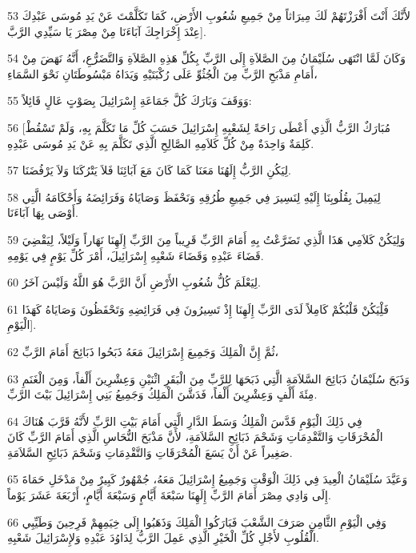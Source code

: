 \par 53 لأَنَّكَ أَنْتَ أَفْرَزْتَهُمْ لَكَ مِيرَاثاً مِنْ جَمِيعِ شُعُوبِ الأَرْضِ، كَمَا تَكَلَّمْتَ عَنْ يَدِ مُوسَى عَبْدِكَ عِنْدَ إِخْرَاجِكَ آبَاءَنَا مِنْ مِصْرَ يَا سَيِّدِي الرَّبَّ].
\par 54 وَكَانَ لَمَّا انْتَهَى سُلَيْمَانُ مِنَ الصَّلاَةِ إِلَى الرَّبِّ بِكُلِّ هَذِهِ الصَّلاَةِ وَالتَّضَرُّعِ، أَنَّهُ نَهَضَ مِنْ أَمَامِ مَذْبَحِ الرَّبِّ مِنَ الْجُثُوِّ عَلَى رُكْبَتَيْهِ وَيَدَاهُ مَبْسُوطَتَانِ نَحْوَ السَّمَاءِ،
\par 55 وَوَقَفَ وَبَارَكَ كُلَّ جَمَاعَةِ إِسْرَائِيلَ بِصَوْتٍ عَالٍ قَائِلاً:
\par 56 [مُبَارَكٌ الرَّبُّ الَّذِي أَعْطَى رَاحَةً لِشَعْبِهِ إِسْرَائِيلَ حَسَبَ كُلِّ مَا تَكَلَّمَ بِهِ، وَلَمْ تَسْقُطْ كَلِمَةٌ وَاحِدَةٌ مِنْ كُلِّ كَلاَمِهِ الصَّالِحِ الَّذِي تَكَلَّمَ بِهِ عَنْ يَدِ مُوسَى عَبْدِهِ.
\par 57 لِيَكُنِ الرَّبُّ إِلَهُنَا مَعَنَا كَمَا كَانَ مَعَ آبَائِنَا فَلاَ يَتْرُكَنَا وَلاَ يَرْفُضَنَا.
\par 58 لِيَمِيلَ بِقُلُوبِنَا إِلَيْهِ لِنَسِيرَ فِي جَمِيعِ طُرُقِهِ وَنَحْفَظَ وَصَايَاهُ وَفَرَائِضَهُ وَأَحْكَامَهُ الَّتِي أَوْصَى بِهَا آبَاءَنَا.
\par 59 وَلِيَكُنْ كَلاَمِي هَذَا الَّذِي تَضَرَّعْتُ بِهِ أَمَامَ الرَّبِّ قَرِيباً مِنَ الرَّبِّ إِلَهِنَا نَهَاراً وَلَيْلاً، لِيَقْضِيَ قَضَاءَ عَبْدِهِ وَقَضَاءَ شَعْبِهِ إِسْرَائِيلَ، أَمْرَ كُلِّ يَوْمٍ فِي يَوْمِهِ.
\par 60 لِيَعْلَمَ كُلُّ شُعُوبِ الأَرْضِ أَنَّ الرَّبَّ هُوَ اللَّهُ وَلَيْسَ آخَرُ.
\par 61 فَلِْيَكُنْ قَلْبُكُمْ كَامِلاً لَدَى الرَّبِّ إِلَهِنَا إِذْ تَسِيرُونَ فِي فَرَائِضِهِ وَتَحْفَظُونَ وَصَايَاهُ كَهَذَا الْيَوْمِ].
\par 62 ثُمَّ إِنَّ الْمَلِكَ وَجَمِيعَ إِسْرَائِيلَ مَعَهُ ذَبَحُوا ذَبَائِحَ أَمَامَ الرَّبِّ،
\par 63 وَذَبَحَ سُلَيْمَانُ ذَبَائِحَ السَّلاَمَةِ الَّتِي ذَبَحَهَا لِلرَّبِّ مِنَ الْبَقَرِ اثْنَيْنِ وَعِشْرِينَ أَلْفاً، وَمِنَ الْغَنَمِ مِئَةَ أَلْفٍ وَعِشْرِينَ أَلْفاً، فَدَشَّنَ الْمَلِكُ وَجَمِيعُ بَنِي إِسْرَائِيلَ بَيْتَ الرَّبِّ.
\par 64 فِي ذَلِكَ الْيَوْمِ قَدَّسَ الْمَلِكُ وَسَطَ الدَّارِ الَّتِي أَمَامَ بَيْتِ الرَّبِّ لأَنَّهُ قَرَّبَ هُنَاكَ الْمُحْرَقَاتِ وَالتَّقْدِمَاتِ وَشَحْمَ ذَبَائِحِ السَّلاَمَةِ، لأَنَّ مَذْبَحَ النُّحَاسِ الَّذِي أَمَامَ الرَّبِّ كَانَ صَغِيراً عَنْ أَنْ يَسَعَ الْمُحْرَقَاتِ وَالتَّقْدِمَاتِ وَشَحْمَ ذَبَائِحِ السَّلاَمَةِ.
\par 65 وَعَيَّدَ سُلَيْمَانُ الْعِيدَ فِي ذَلِكَ الْوَقْتِ وَجَمِيعُ إِسْرَائِيلَ مَعَهُ، جُمْهُورٌ كَبِيرٌ مِنْ مَدْخَلِ حَمَاةَ إِلَى وَادِي مِصْرَ أَمَامَ الرَّبِّ إِلَهِنَا سَبْعَةَ أَيَّامٍ وَسَبْعَةَ أَيَّامٍ، أَرْبَعَةَ عَشَرَ يَوْماً.
\par 66 وَفِي الْيَوْمِ الثَّامِنِ صَرَفَ الشَّعْبَ فَبَارَكُوا الْمَلِكَ وَذَهَبُوا إِلَى خِيَمِهِمْ فَرِحِينَ وَطَيِّبِي الْقُلُوبِ لأَجْلِ كُلِّ الْخَيْرِ الَّذِي عَمِلَ الرَّبُّ لِدَاوُدَ عَبْدِهِ وَلإِسْرَائِيلَ شَعْبِهِ.

